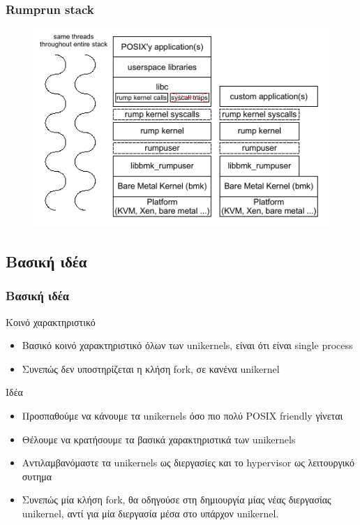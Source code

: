 \documentclass[red,slidestop,notes,compress,mathserif]{beamer}
\begin{document}
\begin{frame}
\frametitle{Rumprun stack}
\begin{figure}
\center
	\includegraphics[scale=0.5]{figures/rumprun_stack.png}
\end{figure}
\end{frame}

\subsection{Βασική ιδέα}
\begin{frame}
\frametitle{Βασική ιδέα}
\begin{block}{Κοινό χαρακτηριστικό}
\begin{itemize}
\item Βασικό κοινό χαρακτηριστικό όλων των unikernels, είναι ότι είναι single process
\item Συνεπώς δεν υποστηρίζεται η κλήση fork, σε κανένα unikernel
\end{itemize}
\end{block}
\begin{block}{Ιδέα}
\begin{itemize}
\item Προσπαθούμε να κάνουμε τα unikernels όσο πιο πολύ POSIX friendly γίνεται
\item Θέλουμε να κρατήσουμε τα βασικά χαρακτηριστικά των unikernels
\item Αντιλαμβανόμαστε τα unikernels ως διεργασίες και το hypervisor ως λειτουργικό συτημα
\item Συνεπώς μία κλήση fork, θα οδηγούσε στη δημιουργία μίας νέας διεργασίας unikernel, αντί για μία διεργασία μέσα στο υπάρχον unikernel.
\end{itemize}
\end{block}
\end{frame}
\end{document}
